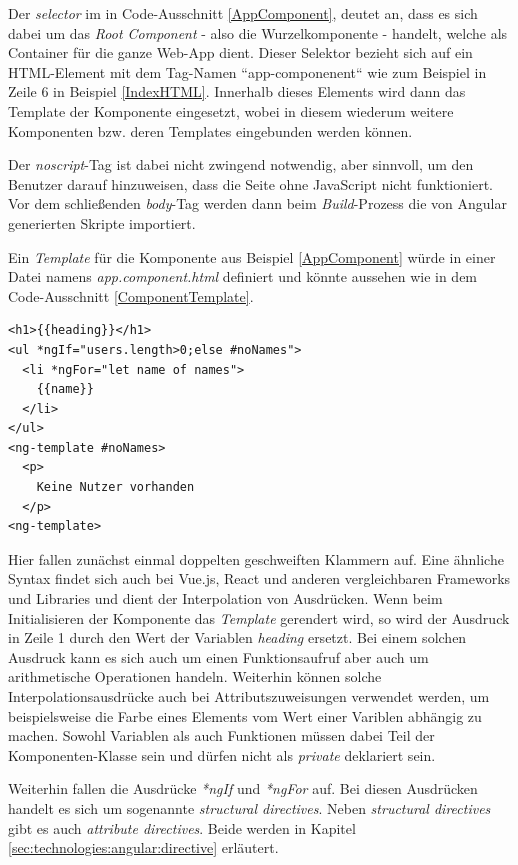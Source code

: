 Der \textit{selector} im in Code-Ausschnitt \ref{AppComponent}, deutet an, dass es sich dabei um das \textit{Root Component} - also die Wurzelkomponente -  handelt, welche als Container für die ganze Web-App dient. Dieser Selektor bezieht sich auf ein \acs{HTML}-Element mit dem Tag-Namen ``app-componenent`` wie zum Beispiel in Zeile 6 in Beispiel \ref{IndexHTML}. Innerhalb dieses Elements wird dann das Template der Komponente eingesetzt, wobei in diesem wiederum weitere Komponenten bzw. deren Templates eingebunden werden können.

Der \textit{noscript}-Tag ist dabei nicht zwingend notwendig, aber sinnvoll, um den Benutzer darauf hinzuweisen, dass die Seite ohne JavaScript nicht funktioniert. Vor dem schließenden \textit{body}-Tag werden dann beim \textit{Build}-Prozess die von Angular generierten Skripte importiert.

Ein \textit{Template} für die Komponente aus Beispiel \ref{AppComponent} würde in einer Datei namens \textit{app.component.html} definiert und könnte aussehen wie in dem Code-Ausschnitt \ref{ComponentTemplate}.

\begin{lstlisting}[float,floatplacement=h, style=htmlcssjs, caption={Beispiel für ein \textit{Template}}, label={ComponentTemplate}]
<h1>{{heading}}</h1>
<ul *ngIf="users.length>0;else #noNames">
  <li *ngFor="let name of names">
    {{name}}		
  </li>
</ul>
<ng-template #noNames>
  <p>
	Keine Nutzer vorhanden	
  </p>
<ng-template>
\end{lstlisting}

Hier fallen zunächst einmal doppelten geschweiften Klammern auf. Eine ähnliche Syntax findet sich auch bei Vue.js, React und anderen vergleichbaren Frameworks und Libraries und dient der Interpolation von Ausdrücken. Wenn beim Initialisieren der Komponente das \textit{Template} gerendert wird, so wird der Ausdruck in Zeile 1 durch den Wert der Variablen \textit{heading} ersetzt. Bei einem solchen Ausdruck kann es sich auch um einen Funktionsaufruf aber auch um arithmetische Operationen handeln. Weiterhin können solche Interpolationsausdrücke auch bei Attributszuweisungen verwendet werden, um beispielsweise die Farbe eines Elements vom Wert einer Variblen abhängig zu machen. Sowohl Variablen als auch Funktionen müssen  dabei Teil der Komponenten-Klasse sein und dürfen nicht als \textit{private} deklariert sein\cite{ComponentHTML}.

Weiterhin fallen die Ausdrücke \textit{*ngIf} und \textit{*ngFor} auf. Bei diesen Ausdrücken handelt es sich um sogenannte \textit{structural directives}. Neben \textit{structural directives} gibt es auch \textit{attribute directives}. Beide werden in Kapitel \ref{sec:technologies:angular:directive} erläutert.

